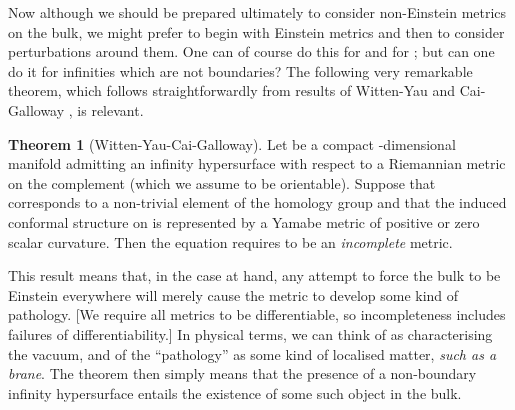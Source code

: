 \documentclass[a4paper,12pt]{article}
\providecommand{\field}[1]{\mathbb{#1}}
\providecommand{\Z}{\field{Z}}
\theoremstyle{definition}
\newtheorem{thm}{Theorem}
\renewcommand{\u}{\textit}
\renewcommand{\-}{\myHighlight{$\dfrac{\quad\enspace}{\quad}$}\coordHE{}}
\begin{document}
Now although we should be prepared ultimately to consider non-Einstein metrics on the bulk, we might prefer to begin with Einstein metrics and then to consider perturbations around them. One can of course do this for \coordHE{} and for \coordHE{}; but can one do it for infinities which are not boundaries? The following very remarkable theorem, which follows straightforwardly from results of Witten-Yau \cite{4} and Cai-Galloway \cite{5}, is relevant.
\begin{thm}[Witten-Yau-Cai-Galloway]
Let \coordHE{} be a compact \coordHE{}-dimensional manifold admitting an infinity hypersurface \coordHE{} with respect to a Riemannian metric \coordHE{} on the complement (which we assume to be orientable). Suppose that \coordHE{} corresponds to a non-trivial element of the homology group \myHighlight{$H_n(\hat{M}^{n+1},\Z)$}\coordHE{} and that the induced conformal structure on \coordHE{} is represented by a Yamabe metric of positive or zero scalar curvature. Then the equation \coordHE{} requires \coordHE{} to be an \u{incomplete} metric.
\end{thm}

This result means that, in the case at hand, any attempt to force the bulk to be Einstein everywhere will merely cause the metric to develop some kind of pathology. [We require
all metrics to be differentiable, so incompleteness includes failures of differentiability.]
In physical terms, we can think of \coordHE{} as characterising the vacuum, and of the ``pathology'' as some kind of localised matter, \u{such as a brane}. The theorem then simply means that the presence of a non-boundary infinity hypersurface entails the existence of some such object in the bulk.
\end{document}

